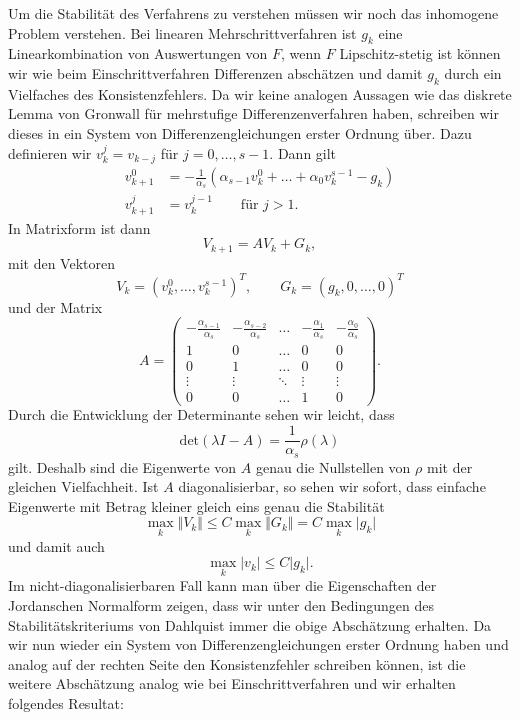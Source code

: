 Um die Stabilität des Verfahrens zu verstehen müssen wir noch das inhomogene Problem verstehen. Bei linearen Mehrschrittverfahren ist $g_k$ eine Linearkombination von Auswertungen von $F$, wenn $F$ Lipschitz-stetig ist können wir wie beim Einschrittverfahren Differenzen abschätzen und damit $g_k$ durch ein Vielfaches des Konsistenzfehlers. Da wir keine analogen Aussagen wie das diskrete Lemma von Gronwall für mehrstufige Differenzenverfahren haben, schreiben wir dieses in ein System von Differenzengleichungen erster Ordnung über. Dazu definieren wir $v_k^j = v_{k-j}$ für $j=0,\ldots,s-1$. Dann gilt 
\begin{align*}
v_{k+1}^0 &= - \frac{1}{\alpha_s} (\alpha_{s-1} v_k^0 + \ldots + \alpha_0 v^{s-1}_k  - g_k) \\
v_{k+1}^j &= v_k^{j-1} \qquad \text{für } j > 1.
\end{align*}
In Matrixform ist dann
$$ V_{k+1} = A V_k + G_k, $$
mit den Vektoren
$$ V_k = (v_k^0,\ldots,v_k^{s-1})^T, \qquad G_k = (g_k,0,\ldots,0)^T $$
und der Matrix 
$$ A = \left( \begin{array}{ccccc} -\frac{\alpha_{s-1}}{\alpha_s} & -\frac{\alpha_{s-2}}{\alpha_s} & \ldots & 
-\frac{\alpha_{1}}{\alpha_s} & -\frac{\alpha_{0}}{\alpha_s}  \\ 1 & 0 & \ldots & 0 & 0 \\ 0 & 1 & \ldots & 0 & 0 \\
\vdots & \vdots & \ddots & \vdots & \vdots \\ 0 & 0 & \ldots & 1 & 0 \end{array} \right) .$$
Durch die Entwicklung der Determinante sehen wir leicht, dass
$$ \text{det}(\lambda I - A) = \frac{1}{\alpha_s} \rho(\lambda) $$
gilt. Deshalb sind die Eigenwerte von $A$ genau die Nullstellen von $\rho$ mit der gleichen Vielfachheit. Ist $A$ diagonalisierbar, so sehen wir sofort, dass einfache Eigenwerte mit Betrag kleiner gleich eins genau die Stabilität
$$ \max_k \Vert V_k \Vert \leq C \max_k \Vert G_k \Vert = C \max_k \vert g_k \vert $$
und damit auch 
$$ \max_k \vert v_k \vert \leq C \vert g_k \vert .$$
Im nicht-diagonalisierbaren Fall kann man über die Eigenschaften der Jordanschen Normalform zeigen, dass wir unter den Bedingungen des Stabilitätskriteriums von Dahlquist immer die obige Abschätzung erhalten. Da wir nun wieder ein System von Differenzengleichungen erster Ordnung haben und analog auf der rechten Seite den Konsistenzfehler schreiben können, ist die weitere Abschätzung analog wie bei Einschrittverfahren und wir erhalten folgendes Resultat:

